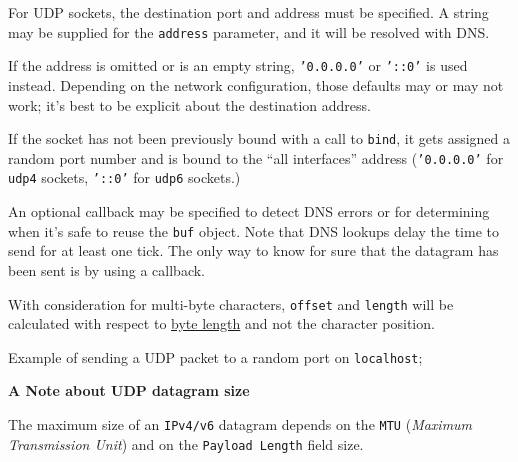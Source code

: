 For UDP sockets, the destination port and address must be specified. A
string may be supplied for the \texttt{address} parameter, and it will
be resolved with DNS.

If the address is omitted or is an empty string, \texttt{'0.0.0.0'} or
\texttt{'::0'} is used instead. Depending on the network configuration,
those defaults may or may not work; it's best to be explicit about the
destination address.

If the socket has not been previously bound with a call to
\texttt{bind}, it gets assigned a random port number and is bound to the
``all interfaces'' address (\texttt{'0.0.0.0'} for \texttt{udp4}
sockets, \texttt{'::0'} for \texttt{udp6} sockets.)

An optional callback may be specified to detect DNS errors or for
determining when it's safe to reuse the \texttt{buf} object. Note that
DNS lookups delay the time to send for at least one tick. The only way
to know for sure that the datagram has been sent is by using a callback.

With consideration for multi-byte characters, \texttt{offset} and
\texttt{length} will be calculated with respect to
\href{buffer.html\#buffer_class_method_buffer_bytelength_string_encoding}{byte
length} and not the character position.

Example of sending a UDP packet to a random port on \texttt{localhost};

\begin{Shaded}
\begin{Highlighting}[]
 \NormalTok{(}\NormalTok{);}
  \NormalTok{(}\NormalTok{);}
 \NormalTok{(}\NormalTok{);}
\NormalTok{, }\NormalTok{, }\NormalTok{, }\NormalTok{, }
  \NormalTok{();}
\NormalTok{\});}
\end{Highlighting}
\end{Shaded}

\textbf{A Note about UDP datagram size}

The maximum size of an \texttt{IPv4/v6} datagram depends on the
\texttt{MTU} (\emph{Maximum Transmission Unit}) and on the
\texttt{Payload Length} field size.

